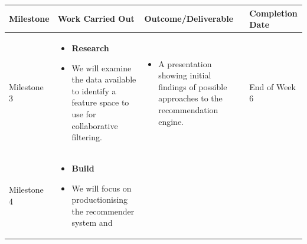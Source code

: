 \documentclass[]{book}
\providecommand{\tightlist}{%
  \setlength{\itemsep}{0pt}\setlength{\parskip}{0pt}}
\begin{document}
\begin{smaller}

\begin{longtable}[]{@{}llll@{}}
\toprule
\begin{minipage}[b]{0.14\columnwidth}\raggedright
Milestone\strut
\end{minipage} & \begin{minipage}[b]{0.30\columnwidth}\raggedright
Work Carried Out\strut
\end{minipage} & \begin{minipage}[b]{0.30\columnwidth}\raggedright
Outcome/Deliverable\strut
\end{minipage} & \begin{minipage}[b]{0.15\columnwidth}\raggedright
Completion Date\strut
\end{minipage}\tabularnewline
\midrule
\endhead
\begin{minipage}[t]{0.14\columnwidth}\raggedright
Milestone 3\strut
\end{minipage} & \begin{minipage}[t]{0.30\columnwidth}\raggedright
\begin{itemize}
\tightlist
\item
  \textbf{Research}
\item
  We will examine the data available to identify a feature space to use
  for collaborative filtering.
\end{itemize}\strut
\end{minipage} & \begin{minipage}[t]{0.30\columnwidth}\raggedright
\begin{itemize}
\tightlist
\item
  A presentation showing initial findings of possible approaches to the
  recommendation engine.
\end{itemize}\strut
\end{minipage} & \begin{minipage}[t]{0.15\columnwidth}\raggedright
End of Week 6\strut
\end{minipage}\tabularnewline
\begin{minipage}[t]{0.14\columnwidth}\raggedright
Milestone 4\strut
\end{minipage} & \begin{minipage}[t]{0.30\columnwidth}\raggedright
\begin{itemize}
\tightlist
\item
  \textbf{Build}
\item
  We will focus on productionising the recommender system and

\end{itemize}
\end{minipage}
\end{longtable}
\end{smaller}
\end{document}
